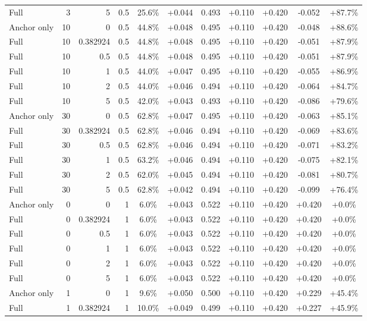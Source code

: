 \begin{table}[htbp]
\begin{tabular}{lrrrccccccc}
Full & 3 & 5 & 0.5 & 25.6\% & +0.044 & 0.493 & +0.110 & +0.420 & -0.052 & +87.7\% \\
Anchor only & 10 & 0 & 0.5 & 44.8\% & +0.048 & 0.495 & +0.110 & +0.420 & -0.048 & +88.6\% \\
Full & 10 & 0.382924 & 0.5 & 44.8\% & +0.048 & 0.495 & +0.110 & +0.420 & -0.051 & +87.9\% \\
Full & 10 & 0.5 & 0.5 & 44.8\% & +0.048 & 0.495 & +0.110 & +0.420 & -0.051 & +87.9\% \\
Full & 10 & 1 & 0.5 & 44.0\% & +0.047 & 0.495 & +0.110 & +0.420 & -0.055 & +86.9\% \\
Full & 10 & 2 & 0.5 & 44.0\% & +0.046 & 0.494 & +0.110 & +0.420 & -0.064 & +84.7\% \\
Full & 10 & 5 & 0.5 & 42.0\% & +0.043 & 0.493 & +0.110 & +0.420 & -0.086 & +79.6\% \\
Anchor only & 30 & 0 & 0.5 & 62.8\% & +0.047 & 0.495 & +0.110 & +0.420 & -0.063 & +85.1\% \\
Full & 30 & 0.382924 & 0.5 & 62.8\% & +0.046 & 0.494 & +0.110 & +0.420 & -0.069 & +83.6\% \\
Full & 30 & 0.5 & 0.5 & 62.8\% & +0.046 & 0.494 & +0.110 & +0.420 & -0.071 & +83.2\% \\
Full & 30 & 1 & 0.5 & 63.2\% & +0.046 & 0.494 & +0.110 & +0.420 & -0.075 & +82.1\% \\
Full & 30 & 2 & 0.5 & 62.0\% & +0.045 & 0.494 & +0.110 & +0.420 & -0.081 & +80.7\% \\
Full & 30 & 5 & 0.5 & 62.8\% & +0.042 & 0.494 & +0.110 & +0.420 & -0.099 & +76.4\% \\
Anchor only & 0 & 0 & 1 & 6.0\% & +0.043 & 0.522 & +0.110 & +0.420 & +0.420 & +0.0\% \\
Full & 0 & 0.382924 & 1 & 6.0\% & +0.043 & 0.522 & +0.110 & +0.420 & +0.420 & +0.0\% \\
Full & 0 & 0.5 & 1 & 6.0\% & +0.043 & 0.522 & +0.110 & +0.420 & +0.420 & +0.0\% \\
Full & 0 & 1 & 1 & 6.0\% & +0.043 & 0.522 & +0.110 & +0.420 & +0.420 & +0.0\% \\
Full & 0 & 2 & 1 & 6.0\% & +0.043 & 0.522 & +0.110 & +0.420 & +0.420 & +0.0\% \\
Full & 0 & 5 & 1 & 6.0\% & +0.043 & 0.522 & +0.110 & +0.420 & +0.420 & +0.0\% \\
Anchor only & 1 & 0 & 1 & 9.6\% & +0.050 & 0.500 & +0.110 & +0.420 & +0.229 & +45.4\% \\
Full & 1 & 0.382924 & 1 & 10.0\% & +0.049 & 0.499 & +0.110 & +0.420 & +0.227 & +45.9\% \\

\end{tabular}
\end{table}

